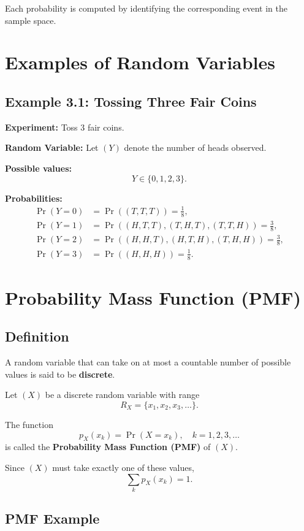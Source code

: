 \documentclass[11pt]{article}
\begin{document}
Each probability is computed by identifying the corresponding event in the
sample space.

\section{Examples of Random Variables}

\subsection*{Example 3.1: Tossing Three Fair Coins}

\textbf{Experiment:} Toss 3 fair coins.

\textbf{Random Variable:} Let $(Y)$ denote the number of heads observed.

\textbf{Possible values:}
\[
Y \in \{0,1,2,3\}.
\]

\textbf{Probabilities:}
\[
\begin{aligned}
\Pr(Y=0) &= \Pr((T,T,T)) = \tfrac{1}{8},\\
\Pr(Y=1) &= \Pr((H,T,T),(T,H,T),(T,T,H)) = \tfrac{3}{8},\\
\Pr(Y=2) &= \Pr((H,H,T),(H,T,H),(T,H,H)) = \tfrac{3}{8},\\
\Pr(Y=3) &= \Pr((H,H,H)) = \tfrac{1}{8}.
\end{aligned}
\]

\section{Probability Mass Function (PMF)}

\subsection{Definition}

A random variable that can take on at most a countable number of possible values
is said to be \textbf{discrete}.

Let $(X)$ be a discrete random variable with range
\[
R_X = \{x_1, x_2, x_3, \ldots\}.
\]

The function
\[
p_X(x_k) = \Pr(X = x_k), \quad k = 1,2,3,\ldots
\]
is called the \textbf{Probability Mass Function (PMF)} of $(X)$.

Since $(X)$ must take exactly one of these values,
\[
\sum_k p_X(x_k) = 1.
\]

\subsection{PMF Example}
\end{document}
